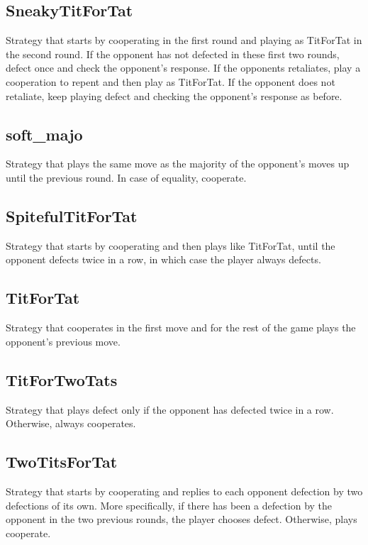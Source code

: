 \subsection{SneakyTitForTat}
Strategy that starts by cooperating in the first round and playing as TitForTat in the second round. If the opponent has not defected in these first two rounds, defect once and check the opponent's response. If the opponents retaliates, play a cooperation to repent and then play as TitForTat. If the opponent does not retaliate, keep playing defect and checking the opponent's response as before.

\subsection{soft\_majo}
Strategy that plays the same move as the majority of the opponent's moves up until the previous round. In case of equality, cooperate.

\subsection{SpitefulTitForTat}
Strategy that starts by cooperating and then plays like TitForTat, until the opponent defects twice in a row, in which case the player always defects.

\subsection{TitForTat}
Strategy that cooperates in the first move and for the rest of the game plays the opponent's previous move.

\subsection{TitForTwoTats}
Strategy that plays defect only if the opponent has defected twice in a row. Otherwise, always cooperates.

\subsection{TwoTitsForTat}
Strategy that starts by cooperating and replies to each opponent defection by two defections of its own. More specifically, if there has been a defection by the opponent in the two previous rounds, the player chooses defect. Otherwise, plays cooperate.
